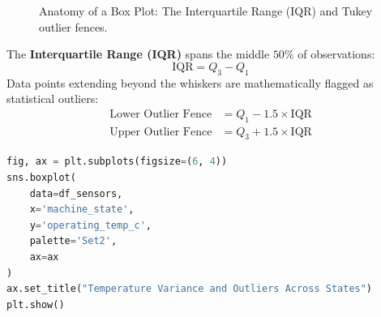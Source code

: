\begin{figure}[htbp]
\centering
{}
\caption{Anatomy of a Box Plot: The Interquartile Range (IQR) and Tukey outlier fences.}\label{fig:boxplot_anatomy}
\end{figure}

The \textbf{Interquartile Range (IQR)} spans the middle $50\%$ of observations:
\begin{equation}
\text{IQR} = Q_3 - Q_1\label{eq:iqr}
\end{equation}
Data points extending beyond the whiskers are mathematically flagged as statistical outliers:
\begin{align*}
\text{Lower Outlier Fence} &= Q_1 - 1.5 \times \text{IQR} \\
\text{Upper Outlier Fence} &= Q_3 + 1.5 \times \text{IQR}
\end{align*}

\begin{lstlisting}[language=Python]
fig, ax = plt.subplots(figsize=(6, 4))
sns.boxplot(
    data=df_sensors, 
    x='machine_state', 
    y='operating_temp_c', 
    palette='Set2', 
    ax=ax
)
ax.set_title("Temperature Variance and Outliers Across States")
plt.show()
\end{lstlisting}

